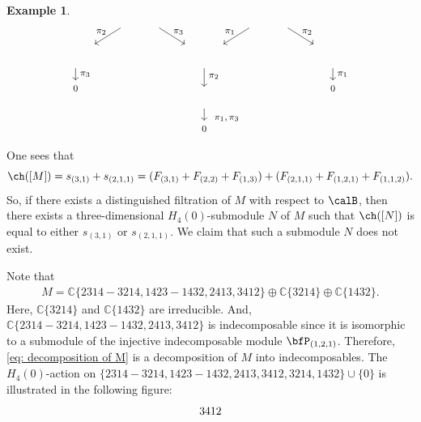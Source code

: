 \documentclass[12pt, reqno]{amsart}
\theoremstyle{definition}
\newtheorem{example}[theorem]{Example}
\numberwithin{equation}{section} \numberwithin{figure}{section}
\numberwithin{table}{section}
\def\C{\mathbb C}
\begin{document}
\begin{example}
\[\begin{tikzpicture}
\draw[->] (0*\hp, 0.7*\vp) -- (0, 0.3);
\node at (0.15*\hp, 0.5*\vp) {\footnotesize $\pi_2$};

\draw[->] (-1.3*\hp, 1.7*\vp) -- (-1.7*\hp, 1.3*\vp);
\node at (-1.6*\hp, 1.6*\vp) {\footnotesize $\pi_2$};

\draw[->] (-0.7*\hp, 1.7*\vp) -- (-0.3*\hp, 1.3*\vp);
\node at (-0.4*\hp, 1.6*\vp) {\footnotesize $\pi_3$};

\draw[->] (1.3*\hp, 1.7*\vp) -- (1.7*\hp, 1.3*\vp);
\node at (1.6*\hp, 1.6*\vp) {\footnotesize $\pi_2$};

\draw[->] (0.7*\hp, 1.7*\vp) -- (0.3*\hp, 1.3*\vp);
\node at (0.4*\hp, 1.6*\vp) {\footnotesize $\pi_1$};

\draw[->] (0 *\hp, -0.3*\vp) -- (0*\hp, -0.6*\vp);
\node at (0*\hp, -0.8*\vp) {\footnotesize $0$};
\node at (0.35*\hp, -.55*\vp) {\footnotesize $\pi_1, \pi_3$};


\draw[->] (-2 *\hp, 0.7*\vp) -- (-2*\hp, 0.4*\vp);
\node at (-2*\hp, 0.2*\vp) {\footnotesize $0$};
\node at (-1.85*\hp, 0.55*\vp) {\footnotesize $\pi_3$};

\draw[->] (2 *\hp, 0.7*\vp) -- (2*\hp, 0.4*\vp);
\node at (2*\hp, 0.2*\vp) {\footnotesize $0$};
\node at (2.15*\hp, 0.55*\vp) {\footnotesize $\pi_1$};

\end{tikzpicture}
\]
One sees that 
\[
\ch([M]) = s_{(3,1)} + s_{(2,1,1)} = (F_{(3,1)} + F_{(2,2)} + F_{(1,3)}) + (F_{(2,1,1)} + F_{(1,2,1)} + F_{(1,1,2)}).
\]
So, if there exists a distinguished filtration of $M$ with respect to $\calB$, then there exists a three-dimensional $H_4(0)$-submodule $N$ of $M$ such that $\ch([N])$ is equal to either $s_{(3,1)}$ or $s_{(2,1,1)}$.
We claim that such a submodule $N$ does not exist.


Note that
\begin{align}\label{eq: decomposition of M}
M = \C \{2314 - 3214, 1423-1432, 2413, 3412 \} \oplus \C \{3214\} \oplus \C \{1432\}. 
\end{align}
Here, $\C \{3214\}$ and $\C \{1432\}$ are irreducible.
And, $\C \{2314 - 3214, 1423-1432, 2413, 3412 \}$ is indecomposable since it is isomorphic to a submodule of the injective indecomposable module $\bfP_{(1,2,1)}$.
Therefore, \cref{eq: decomposition of M} is a decomposition of $M$ into indecomposables.
The $H_4(0)$-action on $\{2314 - 3214, 1423-1432, 2413, 3412, 3214, 1432\} \cup \{ 0 \}$ is illustrated in the following figure:
\[
\def \vp {1.25}
\def \hp {2}
\begin{tikzpicture}
\node[] at (0*\hp, 0*\vp) {$3412$};


\end{tikzpicture}\]
\end{example}
\end{document}
